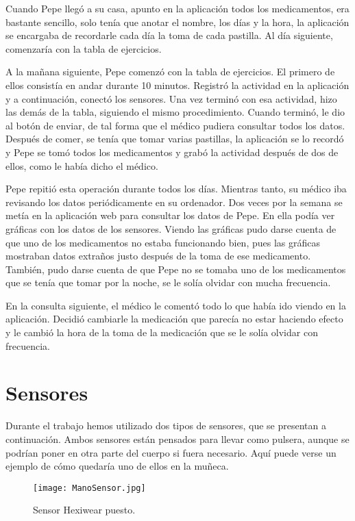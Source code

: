 Cuando Pepe llegó a su casa, apunto en la aplicación todos los medicamentos, era bastante sencillo, solo tenía que anotar el nombre, los días y la hora, la aplicación se encargaba de recordarle cada día la toma de cada pastilla. Al día siguiente, comenzaría con la tabla de ejercicios.
\newline

A la mañana siguiente, Pepe comenzó con la tabla de ejercicios. El primero de ellos consistía en andar durante 10 minutos. Registró la actividad en la aplicación y a continuación, conectó los sensores. Una vez terminó con esa actividad, hizo las demás de la tabla, siguiendo el mismo procedimiento. Cuando terminó, le dio al botón de enviar, de tal forma que el médico pudiera consultar todos los datos. Después de comer, se tenía que tomar varias pastillas, la aplicación se lo recordó y Pepe se tomó todos los medicamentos y grabó la actividad después de dos de ellos, como le había dicho el médico.
\newline

Pepe repitió esta operación durante todos los días. Mientras tanto, su médico iba revisando los datos periódicamente en su ordenador. Dos veces por la semana se metía en la aplicación web para consultar los datos de Pepe. En ella podía ver gráficas con los datos de los sensores. Viendo las gráficas pudo darse cuenta de que uno de los medicamentos no estaba funcionando bien, pues las gráficas mostraban datos extraños justo después de la toma de ese medicamento. También, pudo darse cuenta de que Pepe no se tomaba uno de los medicamentos que se tenía que tomar por la noche, se le solía olvidar con mucha frecuencia.
\newline

En la consulta siguiente, el médico le comentó todo lo que había ido viendo en la aplicación. Decidió cambiarle la medicación que parecía no estar haciendo efecto y le cambió la hora de la toma de la medicación que se le solía olvidar con frecuencia.
\newpage

\section{Sensores}
Durante el trabajo hemos utilizado dos tipos de sensores, que se presentan a continuación. Ambos sensores están pensados para llevar como pulsera, aunque se podrían poner en otra parte del cuerpo si fuera necesario. Aquí puede verse un ejemplo de cómo quedaría uno de ellos en la muñeca.
\begin{figure}[h!]
  \centering
  \texttt{[image: ManoSensor.jpg]}
  \caption{Sensor Hexiwear puesto.}
\end{figure}


